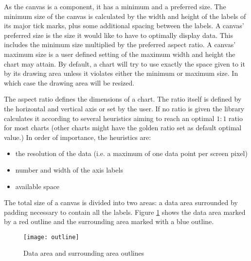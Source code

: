 As the canvas is a component, it has a minimum and a preferred size. The minimum size of the canvas is calculated by the width and height of the labels of its major tick marks, plus some additional spacing between the labels. A canvas' preferred size is the size it would like to have to optimally display data. This includes the minimum size multiplied by the preferred aspect ratio. A canvas' maximum size is a user defined setting of the maximum width and height the chart may attain. By default, a chart will try to use exactly the space given to it by its drawing area unless it violates either the minimum or maximum size. In which case the drawing area will be resized.

The aspect ratio defines the dimensions of a chart. The ratio itself is defined by the horizontal and vertical axis or set by the user. If no ratio is given the library calculates it according to several heuristics aiming to reach an optimal $1:1$ ratio for most charts (other charts might have the golden ratio \cite{weisstein09, few04} set as default optimal value.) In order of importance, the heuristics are: 
\begin{itemize}
\item the resolution of the data (i.e. a maximum of one data point per screen pixel)
\item number and width of the axis labels
\item available space
\end{itemize}
The total size of a canvas is divided into two areas: a data area surrounded by padding necessary to contain all the labels. Figure \ref{outline} shows the data area marked by a red outline and the surrounding area marked with a blue outline.
\begin{figure}[h!]
\centering
\texttt{[image: outline]}
\caption{Data area and surrounding area outlines}
\label{outline}
\end{figure}
